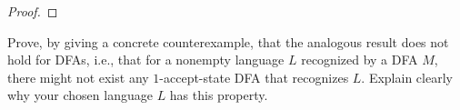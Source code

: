 \begin{problem}
\begin{enumalph}
\begin{Answer}
\begin{lemma}
\begin{proof}
          \end{proof}
        \end{lemma}
        
      \end{Answer}

    \item Prove, by giving a concrete counterexample,
      that the analogous result does not hold for DFAs,
      i.e., that for a nonempty language $L$ recognized by a DFA $M$,
      there might not exist any $1$-accept-state DFA that recognizes $L$.
      Explain clearly why your chosen language $L$ has this property.
      \begin{Answer}

      \end{Answer}
  \end{enumalph}
\end{problem}
